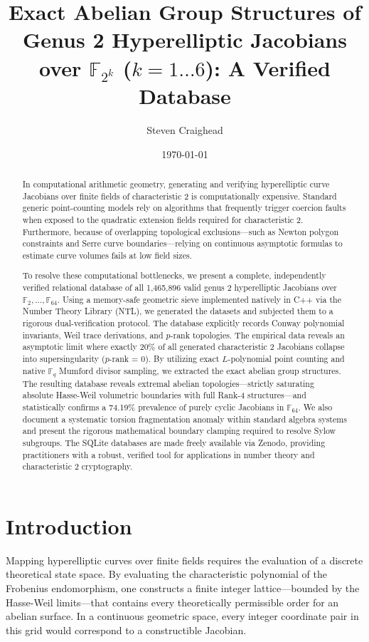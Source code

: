 \documentclass[letterpaper, 11pt]{article}
\title{Exact Abelian Group Structures of Genus 2 Hyperelliptic Jacobians over \texorpdfstring{$\mathbb{F}_{2^k}$}{F\_2\textasciicircum k} (\texorpdfstring{$k=1 \dots 6$}{k=1..6}): A Verified Database}
\author{Steven Craighead}
\date{\today}
\begin{document}
	
	\maketitle
	
	\begin{abstract}
		In computational arithmetic geometry, generating and verifying hyperelliptic curve Jacobians over finite fields of characteristic 2 is computationally expensive. Standard generic point-counting models rely on algorithms that frequently trigger coercion faults when exposed to the quadratic extension fields required for characteristic 2. Furthermore, because of overlapping topological exclusions---such as Newton polygon constraints and Serre curve boundaries---relying on continuous asymptotic formulas to estimate curve volumes fails at low field sizes. 
		
		To resolve these computational bottlenecks, we present a complete, independently verified relational database of all 1,465,896 valid genus 2 hyperelliptic Jacobians over $\mathbb{F}_2, \dots, \mathbb{F}_{64}$. Using a memory-safe geometric sieve implemented natively in C++ via the Number Theory Library (NTL), we generated the datasets and subjected them to a rigorous dual-verification protocol. The database explicitly records Conway polynomial invariants, Weil trace derivations, and $p$-rank topologies. The empirical data reveals an asymptotic limit where exactly 20\% of all generated characteristic 2 Jacobians collapse into supersingularity ($p$-rank = 0). By utilizing exact $L$-polynomial point counting and native $\mathbb{F}_q$ Mumford divisor sampling, we extracted the exact abelian group structures. The resulting database reveals extremal abelian topologies---strictly saturating absolute Hasse-Weil volumetric boundaries with full Rank-4 structures---and statistically confirms a 74.19\% prevalence of purely cyclic Jacobians in $\mathbb{F}_{64}$. We also document a systematic torsion fragmentation anomaly within standard algebra systems and present the rigorous mathematical boundary clamping required to resolve Sylow subgroups. The SQLite databases are made freely available via Zenodo, providing practitioners with a robust, verified tool for applications in number theory and characteristic 2 cryptography.
	\end{abstract}
	
	\section{Introduction}
	Mapping hyperelliptic curves over finite fields requires the evaluation of a discrete theoretical state space. By evaluating the characteristic polynomial of the Frobenius endomorphism, one constructs a finite integer lattice---bounded by the Hasse-Weil limits---that contains every theoretically permissible order for an abelian surface. In a continuous geometric space, every integer coordinate pair in this grid would correspond to a constructible Jacobian.
	
\end{document}
